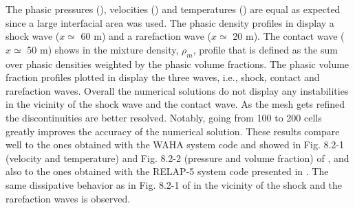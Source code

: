 \documentclass{inputs/mc2015}
\begin{document}
%
The phasic pressures (), velocities () and temperatures () are equal as expected since a large interfacial area was used. The phasic density profiles in  display a shock wave ($x \simeq$ 60 m) and a rarefaction wave ($x \simeq$ 20 m). The contact wave ($x \simeq$ 50 m) shows in the mixture density, $\rho_{m}$, profile that is defined as the sum over phasic densities weighted by the phasic volume fractions. The phasic volume fraction profiles plotted in  display the three waves, i.e., shock, contact and rarefaction waves. Overall the numerical solutions do not display any instabilities in the vicinity of the shock wave and the contact wave. As the mesh gets refined the discontinuities are better resolved. Notably, going from 100 to 200 cells greatly improves the accuracy of the numerical solution. These results compare well to the ones obtained with the WAHA system code and showed in Fig. 8.2-1 (velocity and temperature) and Fig. 8.2-2 (pressure and volume fraction) of \cite{waha-manual}, and also to the ones obtained with the RELAP-5 system code presented in \cite{Sokolowski-Koszela}. The same dissipative behavior as in Fig. 8.2-1 of \cite{waha-manual} in the vicinity of the shock and the rarefaction waves is observed. 
%
%
\end{document}
